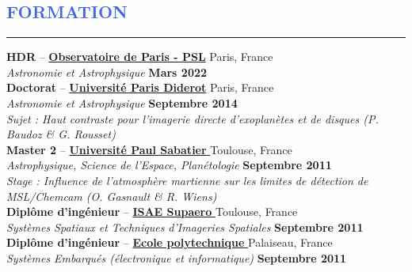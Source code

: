 \documentclass[11pt, a4paper, french]{article}
\begin{document}

\vspace{-0.43cm}
\textcolor{RoyalBlue}{\section{\large FORMATION}
\vspace{-0.2cm}\hrule}
\vspace{0.4cm}


{\bf HDR} -- \href{http://www.obspm.fr}{\textbf{Observatoire de Paris - PSL}}
\hfill Paris, France\\
{\small \it Astronomie et Astrophysique} \hfill  {\small \bf Mars 2022}\\

\vspace{-0.11cm}
{\bf Doctorat} -- \href{https://www.univ-paris-diderot.fr/}{\textbf{Universit\'e Paris Diderot}}
\hfill Paris, France\\
{\small \it Astronomie et Astrophysique} \hfill  {\small \bf Septembre 2014}\\
{\footnotesize
\it Sujet : Haut contraste pour l'imagerie directe d'exoplanètes et de disques (P. Baudoz \& G. Rousset)}\\

\vspace{-0.11cm}
{\bf Master 2} --
\href{http://ezomp2.omp.obs-mip.fr/asep/index.php/fre}{\textbf{Université Paul Sabatier} }
 \hfill Toulouse, France\\
{\small \it Astrophysique, Science de l'Espace, Planétologie} \hfill { \small \bf Septembre 2011}\\
{\footnotesize
\it Stage : Influence de l'atmosphère martienne sur les limites de détection de MSL/Chemcam (O. Gasnault \& R. Wiens)}\\

\vspace{-0.11cm}
{\bf Diplôme d'ingénieur} -- \href{https://www.isae-supaero.fr/}{\textbf{\textbf{ISAE Supaero} }}  \hfill Toulouse, France\\
{\small \it Systèmes Spatiaux et Techniques d'Imageries Spatiales} \hfill { \small \bf Septembre 2011}\\


\vspace{-0.11cm}
{\bf Diplôme d'ingénieur} --
\href{http://www.polytechnique.edu/}{\textbf{\textbf{Ecole polytechnique} }}
\hfill Palaiseau, France  \\
{\small \it Systèmes Embarqués (électronique et informatique)}   \hfill {\small \bf Septembre 2011}\\
\end{document}
